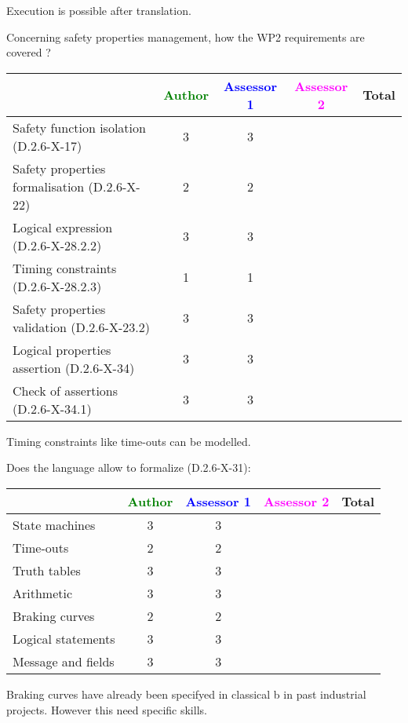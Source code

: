 \begin{author_comment}
Execution is possible after translation.
\end{author_comment}


Concerning safety properties management, how the WP2 requirements are covered ?

\begin{tabular}{|l | c | c | c | c|}
\hline
& \textcolor{green}{Author} & \textcolor{blue}{Assessor 1} & \textcolor{magenta}{Assessor 2} & Total \\
\hline 
Safety function isolation (D.2.6-X-17)  & 3 & 3 & &  \\
\hline 
Safety properties formalisation (D.2.6-X-22)  & 2 & 2 & &  \\
\hline
Logical expression (D.2.6-X-28.2.2)  & 3 & 3 & &  \\
\hline
Timing constraints (D.2.6-X-28.2.3)  & 1 & 1 & &  \\
\hline
Safety properties validation (D.2.6-X-23.2)  & 3 & 3 & &  \\
\hline
Logical properties assertion (D.2.6-X-34)  &  3 & 3 & &  \\
\hline
Check  of assertions (D.2.6-X-34.1)  & 3 & 3 & &  \\
\hline
\end{tabular}


\begin{author_comment}
Timing constraints like time-outs can be modelled.
\end{author_comment}


Does the language allow to  formalize (D.2.6-X-31):

\begin{tabular}{|l | c | c | c | c|}
\hline
& \textcolor{green}{Author} & \textcolor{blue}{Assessor 1} & \textcolor{magenta}{Assessor 2} & Total \\
\hline 
State machines  & 3 & 3 & &  \\
\hline
Time-outs  & 2 & 2 & &  \\
\hline
Truth tables  & 3 & 3 & &  \\
\hline
Arithmetic  & 3 & 3 & &  \\
\hline
Braking curves  & 2 & 2 & &  \\
\hline
Logical statements & 3 & 3 & &  \\
\hline
Message and fields & 3 & 3 & &  \\
\hline
\end{tabular}


\begin{author_comment}
Braking curves have already been specifyed in classical b  in past industrial projects. However this need specific skills.
\end{author_comment}




